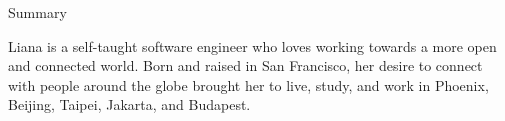 \documentclass{resume} %
\begin{document}

\begin{rSection}{Summary}

Liana is a self-taught software engineer who loves working towards a more open and connected world. Born and raised in San Francisco, her desire to connect with people around the globe brought her to live, study, and work in Phoenix, Beijing, Taipei, Jakarta, and Budapest.




\end{rSection}

\end{document}
